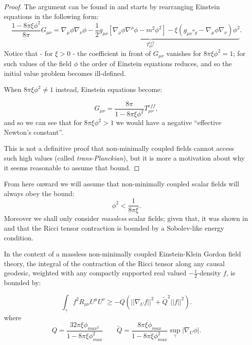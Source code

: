 \begin{proof}
    The argument can be found in \cite{kontou2020energy} and starts by rearranging Einstein equations in the following form:
    \[
      \frac{1 - 8\pi\xi\phi^2}{8\pi}G_{\mu\nu} =  \underbrace{\nabla_{\mu}\phi\nabla_{\nu}\phi - \frac{1}{2}g_{\mu\nu}\left[\nabla_{\rho}\phi\nabla^{\rho}\phi - m^2\phi^2\right] - \xi\left(g_{\mu\nu}\square_g - \nabla_{\mu}\phi\nabla_{\nu}\right)\phi^2}_{T^{eff}_{\mu\nu}}.
    \]
    Notice that - for \(\xi > 0\) - the coefficient in front of \(G_{\mu\nu}\) vanishes for \(8\pi\xi\phi^2 = 1\); for such values of the field \(\phi\) the order of Einstein equations reduces, and so the initial value problem becomes ill-defined.

    When \(8\pi\xi\phi^2 \neq 1\) instead, Einstein equations become:

    \[
        G_{\mu\nu} = \frac{8\pi}{1 - 8\pi\xi\phi^2}T^{eff}_{\mu\nu},
    \]
    and so we can see that for \(8\pi\xi\phi^2 > 1\) we would have a negative ``effective Newton's constant''. 

    This is not a definitive proof that non-minimally coupled fields cannot access such high values (called \emph{trans-Planckian}), but it is more a motivation about why it seems reasonable to assume that bound. 
\end{proof}

From here onward we will assume that non-minimally coupled scalar fields will always obey the bound:
\[
\phi^2 < \frac{1}{8\pi\xi}.    
\]
Moreover we shall only consider \emph{massless} scalar fields; given that, it was shown in \cite{fewster2011singularity} and \cite{brown2018singularity} that the Ricci tensor contraction is bounded by a Sobolev-like energy condition.

\begin{prop}
    In the context of a massless non-minimally coupled Einstein-Klein Gordon field theory, the integral of the contraction of the Ricci tensor along any causal geodesic, weighted with any compactly supported real valued \(-\frac{1}{2}\)-density \(f\), is bounded by:

    \begin{equation}
        \int_{\gamma}f^2 R_{\mu\nu}U^{\mu}U^{\nu} \ge -Q\left(\vert\vert\nabla_U f \vert\vert^2 + \tilde{Q}^2 \vert\vert f\vert\vert^2\right).
    \end{equation}
    where 
    \[
    Q = \frac{32\pi\xi\phi_{max^2}}{1 - 8\pi\xi\phi_{max}
    ^2}
    \quad\quad
    \tilde{Q} = \frac{8\pi\xi\phi_{max}}{1 - 8\pi\xi\phi_{max}
    ^2}\sup_{\gamma}\vert \nabla_U\phi\vert.
    \]
\end{prop}

